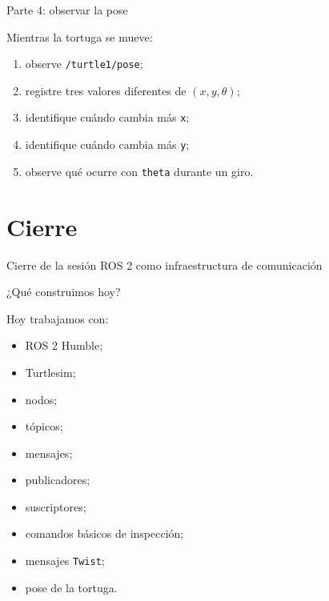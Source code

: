 \documentclass[aspectratio=169]{beamer}
\begin{document}
\begin{frame}{Parte 4: observar la pose}

Mientras la tortuga se mueve:

\begin{enumerate}
    \item observe \texttt{/turtle1/pose};
    \item registre tres valores diferentes de $(x,y,\theta)$;
    \item identifique cuándo cambia más \texttt{x};
    \item identifique cuándo cambia más \texttt{y};
    \item observe qué ocurre con \texttt{theta} durante un giro.
\end{enumerate}

\vspace{0.3cm}


\end{frame}

\section{Cierre}

\SectionSlide
{Cierre de la sesión}
{ROS 2 como infraestructura de comunicación}

\begin{frame}{¿Qué construimos hoy?}

Hoy trabajamos con:

\begin{itemize}
    \item ROS 2 Humble;
    \item Turtlesim;
    \item nodos;
    \item tópicos;
    \item mensajes;
    \item publicadores;
    \item suscriptores;
    \item comandos básicos de inspección;
    \item mensajes \texttt{Twist};
    \item pose de la tortuga.
\end{itemize}

\end{frame}
\end{document}
